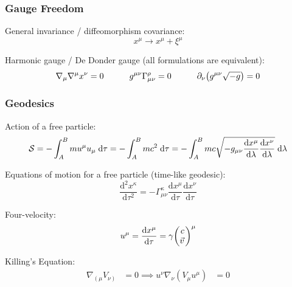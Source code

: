 		\subsubsection{Gauge Freedom}
			General invariance / diffeomorphism covariance:
			\begin{equation}
				x^\mu \to x^\mu + \xi^\mu
			\end{equation}

			\noindent
			Harmonic gauge / De Donder gauge (all formulations are equivalent):
			\begin{equation}
				\nabla_\mu \nabla^\mu x^\nu = 0
				\hspace{30pt} g^{\mu\nu} \Gamma^\rho_{\mu\nu} = 0
				\hspace{30pt} \partial_\nu \qty(g^{\mu\nu}\sqrt{-g}) = 0
			\end{equation}

		\subsubsection{Geodesics}
			\noindent
			Action of a free particle:
			\begin{equation}
				\mathcal{S}
				= -\int_A^B m u^\mu u_\mu \;\dd \tau
				= -\int_A^B mc^2\;\dd \tau
				= -\int_A^B mc\sqrt{-g_{\mu\nu} \dv{x^\mu}{\lambda} \dv{x^\nu}{\lambda}} \;\dd \lambda
			\end{equation}

			\noindent
			Equations of motion for a free particle (time-like geodesic):
			\begin{equation}
				\frac{\mathrm{d}^2 x^\kappa}{\mathrm{d}\tau^2}=-\Gamma_{\mu\nu}^{\kappa}\frac{\mathrm{d}x^\mu}{\mathrm{d}\tau}\frac{\mathrm{d}x^\nu}{\mathrm{d}\tau}
			\end{equation}

			\noindent
			Four-velocity:
			\begin{equation}
				u^\mu = \dv{x^\mu}{\tau} = \gamma \mqty(c \\ \vec{v})^\mu
			\end{equation}

			\noindent
			Killing's Equation:
			\begin{equation}
				\begin{aligned}
					\nabla_{\left(\mu\right.} V_{\left.\nu\right)} &= 0
					\implies u^\nu \nabla_\nu (V_\mu u^\mu) &= 0
				\end{aligned}
			\end{equation}

